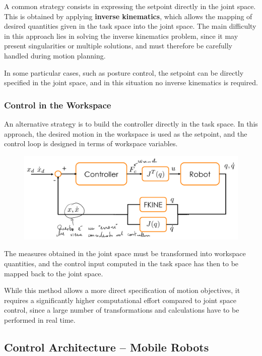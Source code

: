 A common strategy consists in expressing the setpoint directly in the joint space. This is obtained by applying \textbf{inverse kinematics}, which allows the mapping of desired quantities given in the task space into the joint space. The main difficulty in this approach lies in solving the inverse kinematics problem, since it may present singularities or multiple solutions, and must therefore be carefully handled during motion planning.  

In some particular cases, such as posture control, the setpoint can be directly specified in the joint space, and in this situation no inverse kinematics is required.

\subsubsection*{Control in the Workspace}

An alternative strategy is to build the controller directly in the task space. In this approach, the desired motion in the workspace is used as the setpoint, and the control loop is designed in terms of workspace variables. 

\begin{figure}
    \centering
    \includegraphics[width=1\linewidth]{imgs/control_work_space_robotic_arms.png}
\end{figure}

The measures obtained in the joint space must be transformed into workspace quantities, and the control input computed in the task space has then to be mapped back to the joint space.  

While this method allows a more direct specification of motion objectives, it requires a significantly higher computational effort compared to joint space control, since a large number of transformations and calculations have to be performed in real time.  

\hfill

\subsection{Control Architecture – Mobile Robots}


